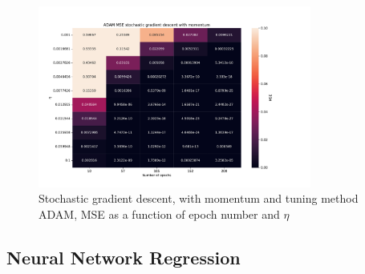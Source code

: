 \begin{figure}[H]
\centering
\includegraphics[width=0.8\textwidth]{Figures/PartA/ADAM_sgdm_MSE(eta,epochs)}
\caption{Stochastic gradient descent, with momentum and tuning method ADAM, MSE as a function of epoch number and \(\eta \)	 }
\label{fig:ADAM_sgdm_MSE-eta-epochs-}
\end{figure}


\subsection{Neural Network Regression}

